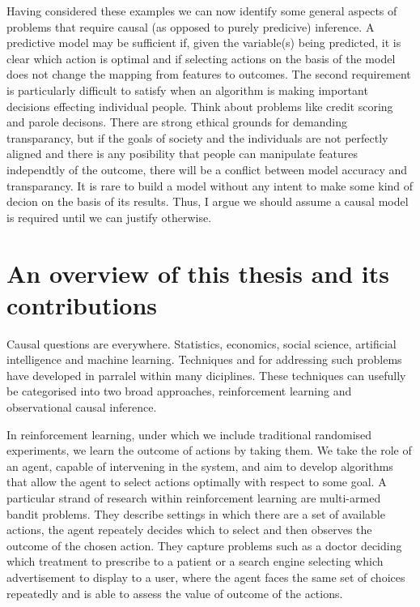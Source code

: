 \documentclass[11pt,a4paper,oneside]{book}
\theoremstyle{plain}
\theoremstyle{definition}
\begin{document}
Having considered these examples we can now identify some general aspects of problems that require causal (as opposed to purely predicive) inference. A predictive model may be sufficient if, given the variable(s) being predicted, it is clear which action is optimal and if selecting actions on the basis of the model does not change the mapping from features to outcomes. The second requirement is particularly difficult to satisfy when an algorithm is making important decisions effecting individual people. Think about problems like credit scoring and parole decisons. There are strong ethical grounds for demanding transparancy, but if the goals of society and the individuals are not perfectly aligned and there is any posibility that people can manipulate features independtly of the outcome, there will be a conflict between model accuracy and transparancy. It is rare to build a model without any intent to make some kind of decion on the basis of its results. Thus, I argue we should assume a causal model is required until we can justify otherwise.  

\section{An overview of this thesis and its contributions}



Causal questions are everywhere. Statistics, economics, social science, artificial intelligence and machine learning. Techniques and for addressing such problems have developed in parralel within many diciplines. These techniques can usefully be categorised into two broad approaches, reinforcement learning and observational causal inference. 

In reinforcement learning, under which we include traditional randomised experiments, we learn the outcome of actions by taking them. We take the role of an agent, capable of intervening in the system, and aim to develop algorithms that allow the agent to select actions optimally with respect to some goal. A particular strand of research within reinforcement learning are multi-armed bandit problems. They describe settings in which there are a set of available actions, the agent repeately decides which to select and then observes the outcome of the chosen action. They capture problems such as a doctor deciding which treatment to prescribe to a patient or a search engine selecting which advertisement to display to a user, where the agent faces the same set of choices repeatedly and is able to assess the value of outcome of the actions. 
\end{document}
